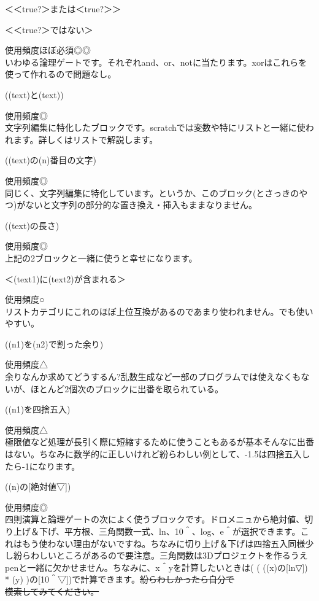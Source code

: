 \documentclass[b5paper,10pt]{jsarticle}
\begin{document}
\begin{multicols*}{3}
\begin{itembox}{5}
＜＜true?＞または＜true?＞＞

＜＜true?＞ではない＞
\end{itembox}
使用頻度ほぼ必須◎◎\\
いわゆる論理ゲートです。それぞれand、or、notに当たります。xorはこれらを使って作れるので問題なし。
\begin{itembox}{6}
((text)と(text))
\end{itembox}
使用頻度◎\\
文字列編集に特化したブロックです。scratchでは変数や特にリストと一緒に使われます。詳しくはリストで解説します。
\begin{itembox}{7}
((text)の(n)番目の文字)
\end{itembox}
使用頻度◎\\
同じく、文字列編集に特化しています。というか、このブロック(とさっきのやつ)がないと文字列の部分的な置き換え・挿入もままなりません。
\begin{itembox}{8}
((text)の長さ)
\end{itembox}
使用頻度◎\\
上記の2ブロックと一緒に使うと幸せになります。
\begin{itembox}{9}
＜(text1)に(text2)が含まれる＞
\end{itembox}
使用頻度○\\
リストカテゴリにこれのほぼ上位互換があるのであまり使われません。でも使いやすい。
\begin{itembox}{10}
((n1)を(n2)で割った余り)
\end{itembox}
使用頻度△\\
余りなんか求めてどうするん?乱数生成など一部のプログラムでは使えなくもないが、ほとんど2個次のブロックに出番を取られている。
\begin{itembox}{11}
((n1)を四捨五入)
\end{itembox}
使用頻度△\\
極限値など処理が長引く際に短縮するために使うこともあるが基本そんなに出番はない。ちなみに数学的に正しいけれど紛らわしい例として、-1.5は四捨五入したら-1になります。
\begin{itembox}{12}
((n)の[絶対値▽])
\end{itembox}
使用頻度◎\\
四則演算と論理ゲートの次によく使うブロックです。ドロメニュから絶対値、切り上げ＆下げ、平方根、三角関数一式、ln、10＾、log、e＾が選択できます。これはもう使わない理由がないですね。ちなみに切り上げ＆下げは四捨五入同様少し紛らわしいところがあるので要注意。三角関数は3Dプロジェクトを作るうえpenと一緒に欠かせません。ちなみに、x＾yを計算したいときは( ( ((x)の[ln▽]) * (y) )の[10＾▽])で計算できます。\sout{紛らわしかったら自分で\\模索してみてください。}

\end{multicols*}
\end{document}
